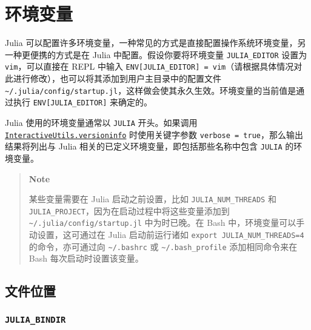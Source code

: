 \hypertarget{4919662572867023119}{}


\chapter{环境变量}



Julia 可以配置许多环境变量，一种常见的方式是直接配置操作系统环境变量，另一种更便携的方式是在 Julia 中配置。假设你要将环境变量 \texttt{JULIA\_EDITOR} 设置为 \texttt{vim}，可以直接在 REPL 中输入 \texttt{ENV[{\textquotedbl}JULIA\_EDITOR{\textquotedbl}] = {\textquotedbl}vim{\textquotedbl}}（请根据具体情况对此进行修改），也可以将其添加到用户主目录中的配置文件 \texttt{{\textasciitilde}/.julia/config/startup.jl}，这样做会使其永久生效。环境变量的当前值是通过执行 \texttt{ENV[{\textquotedbl}JULIA\_EDITOR{\textquotedbl}]} 来确定的。



Julia 使用的环境变量通常以 \texttt{JULIA} 开头。如果调用 \hyperlink{11698106121547091928}{\texttt{InteractiveUtils.versioninfo}} 时使用关键字参数 \texttt{verbose = true}，那么输出结果将列出与 Julia 相关的已定义环境变量，即包括那些名称中包含 \texttt{JULIA} 的环境变量。



\begin{quote}
\textbf{Note}

某些变量需要在 Julia 启动之前设置，比如 \texttt{JULIA\_NUM\_THREADS} 和 \texttt{JULIA\_PROJECT}，因为在启动过程中将这些变量添加到 \texttt{{\textasciitilde}/.julia/config/startup.jl} 中为时已晚。在 Bash 中，环境变量可以手动设置，这可通过在 Julia 启动前运行诸如 \texttt{export JULIA\_NUM\_THREADS=4} 的命令，亦可通过向 \texttt{{\textasciitilde}/.bashrc} 或 \texttt{{\textasciitilde}/.bash\_profile} 添加相同命令来在 Bash 每次启动时设置该变量。

\end{quote}


\hypertarget{10129404461588265763}{}


\section{文件位置}



\hypertarget{11878722049876551255}{}


\subsection{\texttt{JULIA\_BINDIR}}



